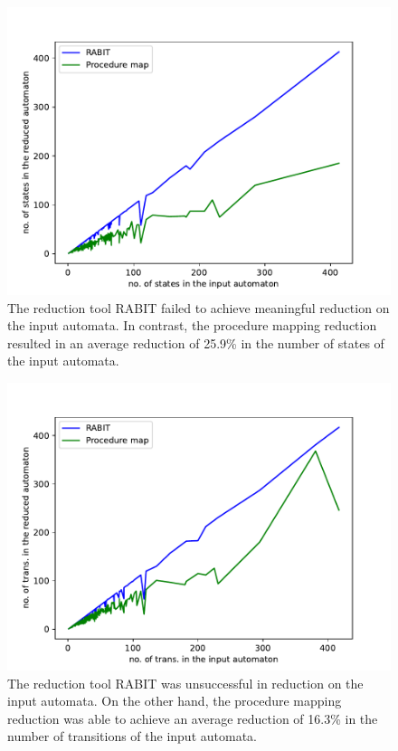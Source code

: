         \begin{figure}[!h]
            \centering
            \captionsetup{justification=justified}
            \includegraphics[width=1\linewidth]{images/stackoverflow-states.pdf}
            \caption{The reduction tool RABIT failed to achieve meaningful reduction on the input automata. In contrast, the procedure mapping reduction resulted in an average reduction of 25.9\% in the number of states of the input automata.}
        \end{figure}

        \begin{figure}[!h]
            \centering
            \captionsetup{justification=justified}
            \includegraphics[width=1\linewidth]{images/stackoverflow-trans.pdf}
            \caption{The reduction tool RABIT was unsuccessful in reduction on the input automata. On the other hand, the procedure mapping reduction was able to achieve an average reduction of 16.3\% in the number of transitions of the input automata.}
        \end{figure}

